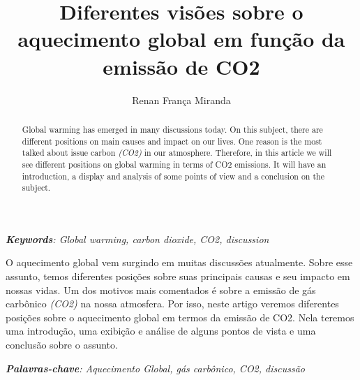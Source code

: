 \documentclass[12pt]{article}
\title{Diferentes visões sobre o aquecimento global em função da emissão de CO2}
\author{Renan França Miranda\inst{1}}
\begin{document}
\maketitle

\begin{abstract}
Global warming has emerged in many discussions today. On
this subject, there are different positions on main causes and 
impact on our lives. One reason is the most talked about issue
carbon \textit{(CO2)} in our atmosphere. Therefore, in this article
we will see different positions on global warming in terms of CO2 emissions.
It will have an introduction, a display and analysis of some points of view
and a conclusion on the subject.
\end{abstract}


\textit{\textbf{Keywords}: Global warming, carbon dioxide, CO2, discussion}

\begin{resumo}
O aquecimento global vem surgindo em muitas discussões atualmente. Sobre
esse assunto, temos diferentes posições sobre suas principais causas e seu
impacto em nossas vidas. Um dos motivos mais comentados é sobre a emissão de
gás carbônico \textit{(CO2)} na nossa atmosfera. Por isso, neste artigo
veremos diferentes posições sobre o aquecimento global em termos da emissão de CO2.
Nela teremos uma introdução, uma exibição e análise de alguns pontos de vista e uma conclusão sobre o assunto.
\end{resumo}

\textit{\textbf{Palavras-chave}: Aquecimento Global, gás carbônico, CO2, discussão}










{}

\end{document}
